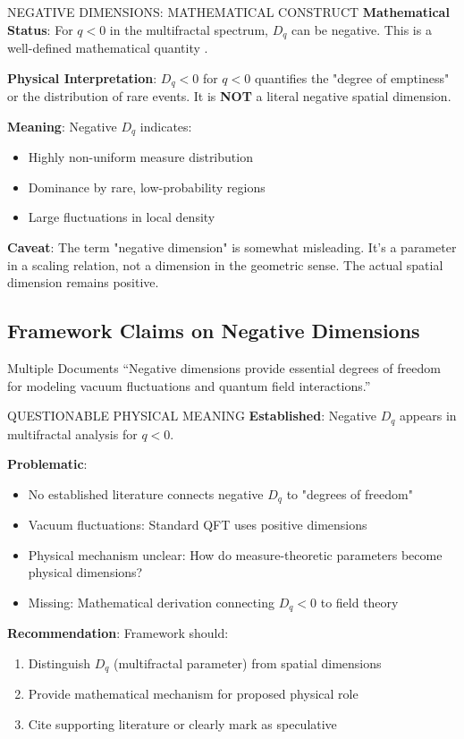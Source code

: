 \begin{factcheck}{NEGATIVE DIMENSIONS: MATHEMATICAL CONSTRUCT}
\textbf{Mathematical Status}: For $q < 0$ in the multifractal spectrum, $D_q$ can be negative. This is a well-defined mathematical quantity \cite{hentschel1983infinite}.

\textbf{Physical Interpretation}: $D_q < 0$ for $q < 0$ quantifies the "degree of emptiness" or the distribution of rare events. It is \textbf{NOT} a literal negative spatial dimension.

\textbf{Meaning}: Negative $D_q$ indicates:
\begin{itemize}
    \item Highly non-uniform measure distribution
    \item Dominance by rare, low-probability regions
    \item Large fluctuations in local density
\end{itemize}

\textbf{Caveat}: The term "negative dimension" is somewhat misleading. It's a parameter in a scaling relation, not a dimension in the geometric sense. The actual spatial dimension remains positive.
\end{factcheck}

\subsection{Framework Claims on Negative Dimensions}

\begin{frameworkclaim}{Multiple Documents}
``Negative dimensions provide essential degrees of freedom for modeling vacuum fluctuations and quantum field interactions.''
\end{frameworkclaim}

\begin{factcheck}{QUESTIONABLE PHYSICAL MEANING}
\textbf{Established}: Negative $D_q$ appears in multifractal analysis for $q < 0$.

\textbf{Problematic}:
\begin{itemize}
    \item[$?$] No established literature connects negative $D_q$ to "degrees of freedom"
    \item[$?$] Vacuum fluctuations: Standard QFT uses positive dimensions
    \item[$?$] Physical mechanism unclear: How do measure-theoretic parameters become physical dimensions?
    \item[$-$] Missing: Mathematical derivation connecting $D_q < 0$ to field theory
\end{itemize}

\textbf{Recommendation}: Framework should:
\begin{enumerate}
    \item Distinguish $D_q$ (multifractal parameter) from spatial dimensions
    \item Provide mathematical mechanism for proposed physical role
    \item Cite supporting literature or clearly mark as speculative
\end{enumerate}
\end{factcheck}

